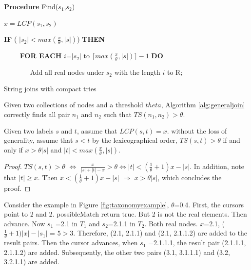 \begin{algorithm}
\begin{compactenum}[(1)]
\end{compactenum}
\smallskip
\textbf{Procedure} Find($s_1$,$s_2$)
\begin{compactenum}[(1)]
\item  $x = LCP(s_1,s_2) $
\item {\bf IF} ( $|s_2| < max(\frac{x}{\theta},|s|)$) {\bf THEN}
\item ~~~~ {\bf FOR EACH} $i$=$|s_2|$ to $ \lceil max(\frac{x}{\theta},|s|) \rceil -1 $ {\bf DO}
\item ~~~~~~~ Add all real nodes under $s_2$ with the length $i$ to R;
\end{compactenum}
\caption{String joins with compact tries}
\label{alg:compactTrieJoin}
\end{algorithm}

\begin{theorem} Given two collections of nodes and a threshold $theta$, Algorithm \ref{alg:generaljoin} correctly finds all pair $n_1$ and $n_2$ such that $TS(n_1,n_2) > \theta$.
\end{theorem}


\begin{lem} Given two labels $s$ and $t$,  assume that $LCP(s,t) = x$. without the loss of generality, assume that $s<t$ by the lexicographical order, $TS(s,t) > \theta$ if and only if  $ x > \theta |s| $ and $  |t| < max(\frac{x}{\theta},|s|)$.
\end{lem}
\begin{proof}  $TS(s,t) > \theta$ $\Leftrightarrow$ $\frac{x}{|s|+|t|-x} > \theta \Leftrightarrow |t| < (\frac{1}{\theta}+1)x-|s|$. In addition, note that $|t| \geq x$. Then $x < (\frac{1}{\theta}+1)x-|s|$ $\Rightarrow$ $x > \theta |s| $, which concludes the proof.
\end{proof}


\smallskip
\smallskip

\begin{example}
Consider the example in Figure \ref{fig:taxonomyexample}, $\theta$=0.4. First, the cursors point to 2 and 2. possibleMatch return true. But 2 is not the real elements.  Then advance. Now $s_1$ =2.1 in $T_1$  and $s_2$=2.1.1 in $T_2$. Both real nodes. $x$=2.1, ($\frac{1}{\theta}+1)|x|-|s_1|$ = $5 > 3$. Therefore, (2.1, 2.1.1) and (2.1, 2.1.1.2) are added to the result pairs. Then the cursor advances, when $s_1$ =2.1.1.1, the result pair (2.1.1.1, 2.1.1.2) are added. Subsequently, the other two pairs (3.1, 3.1.1.1) and (3.2, 3.2.1.1) are added.
\end{example}

